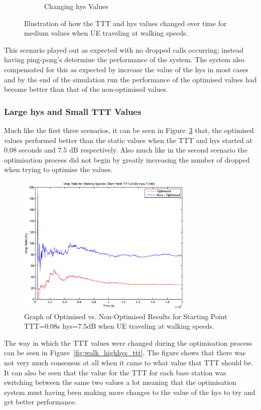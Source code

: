 \begin{figure}[H]
\begin{subfigure}[b]{0.49\textwidth}
                \caption{Changing hys Values}
                \label{fig:walk_low_hys}
        \end{subfigure}
        \caption{Illustration of how the TTT and hys values changed over time for medium values when UE traveling at walking speeds.}\label{fig:walk_low_ttthys}
\end{figure}
This scenario played out as expected with no dropped calls occurring; instead having ping-pong’s determine the performance of the system. The system also compensated for this as expected by increase the value of the hys in most cases and by the end of the simulation run the performance of the optimised values had become better than that of the non-optimised values.
\subsubsection*{Large hys and Small TTT Values}
Much like the first three scenarios, it can be seen in Figure~\ref{fig:walk_highhys_drop} that, the optimised values performed better than the static values when the TTT and hys started at 0.08 seconds and 7.5 dB respectively. Also much like in the second scenario the optimisation process did not begin by greatly increasing the number of dropped when trying to optimise the values.
\begin{figure}[H]
  \begin{center}
    	  \includegraphics[width=0.75\textwidth]{figures/walking_figures/highhys/long_drop.eps}
    \end{center}
    \caption{Graph of Optimised vs. Non-Optimised Results for Starting Point TTT=0.08s hys=7.5dB when UE traveling at walking speeds.}
    \label{fig:walk_highhys_drop}
\end{figure}
The way in which the TTT values were changed during the optimisation process can be seen in Figure~\ref{fig:walk_highhys_ttt}. The figure shows that there was not very much consensus at all when it came to what value that TTT should be. It can also be seen that the value for the TTT for each base station was switching between the same two values a lot meaning that the optimisation system must having been making more changes to the value of the hys to try and get better performance.

